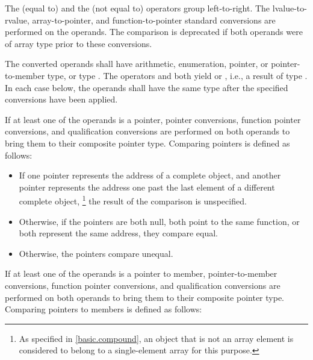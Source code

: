 \pnum
The \tcode{==} (equal to) and the \tcode{!=} (not equal to) operators
group left-to-right.
The
lvalue-to-rvalue,
array-to-pointer,
and function-to-pointer
standard conversions are performed on the operands.
The comparison is deprecated if
both operands were of array type
prior to these conversions.

\pnum
The converted operands shall have arithmetic, enumeration, pointer,
or pointer-to-member type, or type . The operators
\tcode{==} and \tcode{!=} both yield  or , i.e., a
result of type . In each case below, the operands shall have the
same type after the specified conversions have been applied.

\pnum
{}%
%
If at least one of the operands is a pointer,
pointer conversions,
function pointer conversions, and
qualification conversions
are performed on both operands to bring them to their composite pointer type.
Comparing pointers is defined as follows:

\begin{itemize}
\item
If one pointer represents the address of a complete object, and another
pointer represents the address one past the last element of a different
complete object,%
\footnote{As specified in \ref{basic.compound},
an object that is not an array element is
considered to belong to a single-element array for this purpose.}
the result of the comparison is unspecified.
\item
Otherwise, if the pointers are both null, both point to the same
%
function, or both represent the same address,
they compare equal.
\item
Otherwise, the pointers compare unequal.
\end{itemize}

\pnum
If at least one of the operands is a pointer to member,
pointer-to-member conversions,
function pointer conversions, and
qualification conversions
are performed on both operands to bring them to
their composite pointer type.
Comparing pointers to members is defined as follows:

